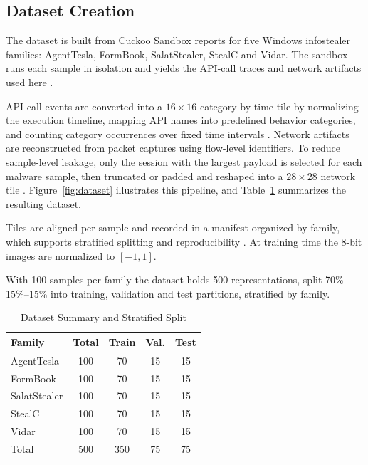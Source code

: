 \documentclass[conference]{IEEEtran}
\begin{document}
\subsection{Dataset Creation}

The dataset is built from Cuckoo Sandbox reports for five Windows infostealer families: AgentTesla, FormBook, SalatStealer, StealC and Vidar. The sandbox runs each sample in isolation and yields the API-call traces and network artifacts used here \cite{pektas2018api,wu2025mines}.

API-call events are converted into a $16 \times 16$ category-by-time tile by normalizing the execution timeline, mapping API names into predefined behavior categories, and counting category occurrences over fixed time intervals \cite{chen2024ctimd}. Network artifacts are reconstructed from packet captures using flow-level identifiers. To reduce sample-level leakage, only the session with the largest payload is selected for each malware sample, then truncated or padded and reshaped into a $28 \times 28$ network tile \cite{davis2024traffic}. Figure~\ref{fig:dataset} illustrates this pipeline, and Table~\ref{tab:dataset} summarizes the resulting dataset.

Tiles are aligned per sample and recorded in a manifest organized by family, which supports stratified splitting and reproducibility \cite{vasan2020imcec}. At training time the 8-bit images are normalized to $[-1,1]$.

With 100 samples per family the dataset holds 500 representations, split 70\%--15\%--15\% into training, validation and test partitions, stratified by family.

\begin{table}[h]
	\caption{Dataset Summary and Stratified Split}
	\label{tab:dataset}
	\centering
	\begin{tabular}{lcccc}
		\toprule
		\textbf{Family} & \textbf{Total} & \textbf{Train} & \textbf{Val.} & \textbf{Test} \\
		\midrule
		AgentTesla   & 100 & 70 & 15 & 15 \\
		FormBook     & 100 & 70 & 15 & 15 \\
		SalatStealer & 100 & 70 & 15 & 15 \\
		StealC       & 100 & 70 & 15 & 15 \\
		Vidar        & 100 & 70 & 15 & 15 \\
		\midrule
		Total        & 500 & 350 & 75 & 75 \\
		\bottomrule
	\end{tabular}
\end{table}
\end{document}
